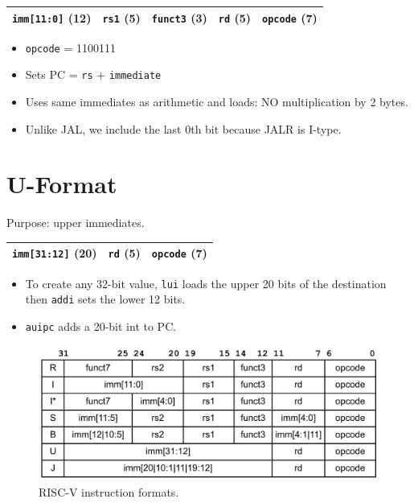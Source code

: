 \medskip
\begin{tabular}{|c|c|c|c|c|}
    \hline
    \texttt{imm[11:0]} (12) &
    \texttt{rs1} (5) &
    \texttt{funct3} (3) &
    \texttt{rd} (5) &
    \texttt{opcode} (7) \\
    \hline
\end{tabular}
\begin{itemize}
    \item \texttt{opcode} = 1100111
    \item Sets PC = \texttt{rs} + \texttt{immediate}
    \item Uses same immediates as arithmetic and loads: NO multiplication by 2 bytes.
    \item Unlike JAL, we include the last 0th bit because JALR is I-type.
\end{itemize}

\section{U-Format}
Purpose: upper immediates.

\medskip
\begin{tabular}{|c|c|c|}
    \hline
    \texttt{imm[31:12]} (20) &
    \texttt{rd} (5) &
    \texttt{opcode} (7) \\
    \hline
\end{tabular}
\begin{itemize}
    \item To create any 32-bit value, \texttt{lui} loads the upper 20 bits of the destination then \texttt{addi} sets the lower 12 bits.
    \item \texttt{auipc} adds a 20-bit int to PC.
\end{itemize}

\medskip
\begin{figure}[H]
  \centering
  \includegraphics[width=1\linewidth]{figures/riscv-instructs}
  \caption{RISC-V instruction formats.}
\end{figure}